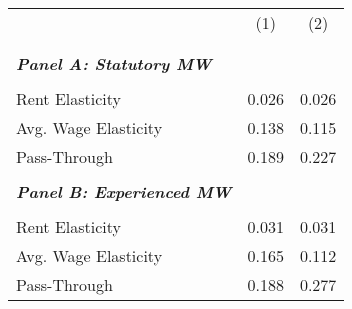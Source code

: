 {
\def\sym#1{\ifmmode^{#1}\else\(^{#1}\)\fi}
\begin{tabular}{l*{2}{c}}
\hline\hline
            &&\\
            &&\\

\vspace{-2mm}&            &            \\
\textit{\textbf{Panel A: Statutory MW}}&            &            \\
\hline      &            &            \\
Rent Elasticity&       0.026&       0.026\\
Avg. Wage Elasticity&       0.138&       0.115\\
Pass-Through&       0.189&       0.227\\
\vspace{1mm}&            &            \\
\textit{\textbf{Panel B: Experienced MW}}&            &            \\
\hline      &            &            \\
Rent Elasticity&       0.031&       0.031\\
Avg. Wage Elasticity&       0.165&       0.112\\
Pass-Through&       0.188&       0.277\\
\hline\hline
\end{tabular}
}
